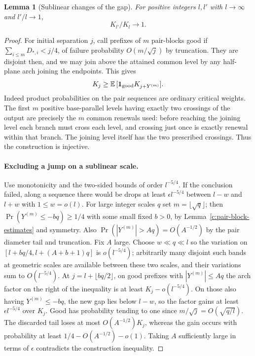 \documentclass[11pt]{article}
\numberwithin{equation}{section}
\newtheorem{lemma}[theorem]{Lemma}
\theoremstyle{definition}\newtheorem{definition}[theorem]{Definition}
\theoremstyle{remark}\newtheorem{remark}[theorem]{Remark}
\begin{document}
\begin{lemma}[Sublinear changes of the gap]\label{c:arch-kernel-regularity}
For positive integers $l,l'$ with $l\to\infty$ and $l'/l\to1$,
\[
 K_{l'}/K_l\longrightarrow1.
\]
\end{lemma}
\begin{proof}
For initial separation \(j\), call prefixes of \(m\) pair-blocks good if \(\sum_{i\le m}D_{*,i}<j/4\), of failure probability \(O(m/\sqrt j)\) by truncation. They are disjoint then, and we may join above the attained common level by any half-plane arch joining the endpoints. This gives
\[
 K_j\ge \mathbb E\,[{\bf1}_{\rm good} K_{j+Y^{(m)}}].
\]
Indeed product probabilities on the pair sequences are ordinary critical weights. The first \(m\) positive base-parallel levels having exactly two crossings of the output are precisely the \(m\) common renewals used: before reaching the joining level each branch must cross each level, and crossing just once is exactly renewal within that branch. The joining level itself has the two prescribed crossings. Thus the construction is injective.



\paragraph{Excluding a jump on a sublinear scale.}
Use monotonicity and the two-sided bounds of order \(l^{-5/4}\). If the conclusion failed, along a sequence there would be drops at least \(\epsilon l^{-5/4}\) between \(l-w\) and \(l+w\) with \(1\le w=o(l)\). For large integer scales \(q\) set \(m=\lfloor\sqrt q\rfloor\); then \(\Pr(Y^{(m)}\le -b q)\ge1/4\) with some small fixed \(b>0\), by Lemma~\ref{c:pair-block-estimates} and symmetry. Also \(\Pr(|Y^{(m)}|>Aq)=O(A^{-1/2})\) by the pair diameter tail and truncation. Fix \(A\) large. Choose \(w\ll q\ll l\) so the variation on \([l+ bq/4,l+(A+b+1)q]\) is \(o(l^{-5/4})\); arbitrarily many disjoint such bands at geometric scales are available between these two scales, and their variations sum to \(O(l^{-5/4})\). At \(j=l+\lfloor bq/2\rfloor\), on good prefixes with \(|Y^{(m)}|\le A q\) the arch factor on the right of the inequality is at least \(K_j-o(l^{-5/4})\). On those also having \(Y^{(m)}\le-bq\), the new gap lies below $l-w$, so the factor gains at least \(\epsilon l^{-5/4}\) over \(K_j\). Good has probability tending to one since $m/\sqrt j=O(\sqrt{q/l})$. The discarded tail loses at most $O(A^{-1/2})K_j$, whereas the gain occurs with probability at least $1/4-O(A^{-1/2})-o(1)$. Taking \(A\) sufficiently large in terms of \(\epsilon\) contradicts the construction inequality.
\end{proof}
\end{document}
